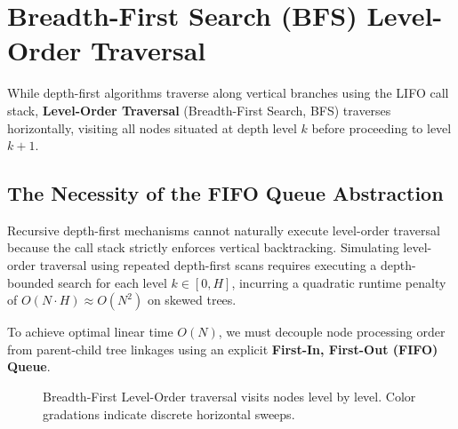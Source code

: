 \documentclass[10pt,journal,compsoc,onecolumn]{IEEEtran}
\begin{document}
\section{Breadth-First Search (BFS) Level-Order Traversal}
\label{sec:level_order}

While depth-first algorithms traverse along vertical branches using the LIFO call stack, \textbf{Level-Order Traversal} (Breadth-First Search, BFS) traverses horizontally, visiting all nodes situated at depth level $k$ before proceeding to level $k + 1$.

\subsection{The Necessity of the FIFO Queue Abstraction}

Recursive depth-first mechanisms cannot naturally execute level-order traversal because the call stack strictly enforces vertical backtracking. Simulating level-order traversal using repeated depth-first scans requires executing a depth-bounded search for each level $k \in [0, H]$, incurring a quadratic runtime penalty of $O(N \cdot H) \approx O(N^2)$ on skewed trees.

To achieve optimal linear time $O(N)$, we must decouple node processing order from parent-child tree linkages using an explicit \textbf{First-In, First-Out (FIFO) Queue}.

\begin{figure}[htbp]
\centering
{}
\caption{Breadth-First Level-Order traversal visits nodes level by level. Color gradations indicate discrete horizontal sweeps.}
\label{fig:level_order_sweep}
\end{figure}
\end{document}

